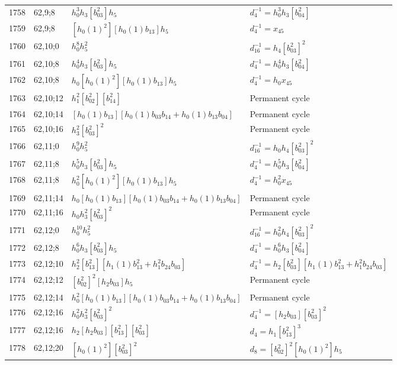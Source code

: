 \documentclass{article}
\begin{document}
\begin{longtable}{|l|l|>{\raggedright\arraybackslash}p{6cm}|>{\raggedright\arraybackslash}p{6cm}|}
\hline
1758 & 62,9;8 & $h_0^3h_3[b_{03}^2]h_5$ & $d_{4}^{-1}=h_0^3h_3[b_{04}^2]$\\
1759 & 62,9;8 & $[h_0(1)^2][h_0(1)b_{13}]h_5$ & $d_{4}^{-1}=x_{45}$\\
\hline
1760 & 62,10;0 & $h_0^8h_5^2$ & $d_{16}^{-1}=h_4[b_{03}^2]^2$\\
\hline
1761 & 62,10;8 & $h_0^4h_3[b_{03}^2]h_5$ & $d_{4}^{-1}=h_0^4h_3[b_{04}^2]$\\
1762 & 62,10;8 & $h_0[h_0(1)^2][h_0(1)b_{13}]h_5$ & $d_{4}^{-1}=h_0x_{45}$\\
\hline
1763 & 62,10;12 & $h_1^2[b_{02}^2][b_{14}^2]$ & Permanent cycle\\
\hline
1764 & 62,10;14 & $[h_0(1)b_{13}][h_0(1)b_{03}b_{14} + h_0(1)b_{13}b_{04}]$ & Permanent cycle\\
\hline
1765 & 62,10;16 & $h_3^2[b_{03}^2]^2$ & Permanent cycle\\
\hline
1766 & 62,11;0 & $h_0^9h_5^2$ & $d_{16}^{-1}=h_0h_4[b_{03}^2]^2$\\
\hline
1767 & 62,11;8 & $h_0^5h_3[b_{03}^2]h_5$ & $d_{4}^{-1}=h_0^5h_3[b_{04}^2]$\\
1768 & 62,11;8 & $h_0^2[h_0(1)^2][h_0(1)b_{13}]h_5$ & $d_{4}^{-1}=h_0^2x_{45}$\\
\hline
1769 & 62,11;14 & $h_0[h_0(1)b_{13}][h_0(1)b_{03}b_{14} + h_0(1)b_{13}b_{04}]$ & Permanent cycle\\
\hline
1770 & 62,11;16 & $h_0h_3^2[b_{03}^2]^2$ & Permanent cycle\\
\hline
1771 & 62,12;0 & $h_0^{10}h_5^2$ & $d_{16}^{-1}=h_0^2h_4[b_{03}^2]^2$\\
\hline
1772 & 62,12;8 & $h_0^6h_3[b_{03}^2]h_5$ & $d_{4}^{-1}=h_0^6h_3[b_{04}^2]$\\
\hline
1773 & 62,12;10 & $h_2^2[b_{13}^2][h_1(1)b_{13}^2 + h_1^2b_{24}b_{03}]$ & $d_{4}^{-1}=h_2[b_{03}^2][h_1(1)b_{13}^2 + h_1^2b_{24}b_{03}]$\\
\hline
1774 & 62,12;12 & $[b_{02}^2]^2[h_2b_{03}]h_5$ & Permanent cycle\\
\hline
1775 & 62,12;14 & $h_0^2[h_0(1)b_{13}][h_0(1)b_{03}b_{14} + h_0(1)b_{13}b_{04}]$ & Permanent cycle\\
\hline
1776 & 62,12;16 & $h_0^2h_3^2[b_{03}^2]^2$ & $d_{4}^{-1}=[h_2b_{03}][b_{03}^2]^2$\\
1777 & 62,12;16 & $h_2[h_2b_{03}][b_{13}^2][b_{03}^2]$ &$d_{4}=h_1[b_{13}^2]^3$\\
\hline
1778 & 62,12;20 & $[h_0(1)^2][b_{03}^2]^2$ &$d_{8}=[b_{02}^2]^2[h_0(1)^2]h_5$\\

\end{longtable}
\end{document}
